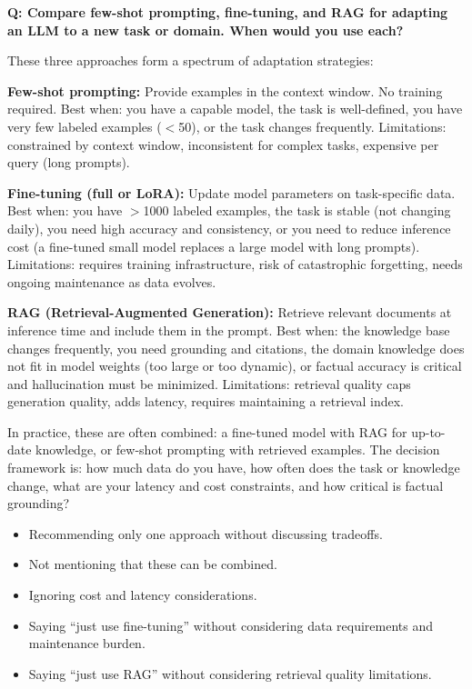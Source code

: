 \begin{interviewq}
\textbf{Q: Compare few-shot prompting, fine-tuning, and RAG for adapting
an LLM to a new task or domain. When would you use each?}

 \quad {} \quad
\badgefreq{\freqhigh}

\stronganswer
These three approaches form a spectrum of adaptation strategies:

\textbf{Few-shot prompting:} Provide examples in the context window.  No
training required.  Best when: you have a capable model, the task is
well-defined, you have very few labeled examples ($<$50), or the task changes
frequently.  Limitations: constrained by context window, inconsistent for
complex tasks, expensive per query (long prompts).

\textbf{Fine-tuning (full or LoRA):} Update model parameters on
task-specific data.  Best when: you have $>$1000 labeled examples, the task
is stable (not changing daily), you need high accuracy and consistency,
or you need to reduce inference cost (a fine-tuned small model replaces a
large model with long prompts).  Limitations: requires training
infrastructure, risk of catastrophic forgetting, needs ongoing maintenance
as data evolves.

\textbf{RAG (Retrieval-Augmented Generation):} Retrieve relevant documents
at inference time and include them in the prompt.  Best when: the knowledge
base changes frequently, you need grounding and citations, the domain
knowledge does not fit in model weights (too large or too dynamic), or
factual accuracy is critical and hallucination must be minimized.
Limitations: retrieval quality caps generation quality, adds latency, requires
maintaining a retrieval index.

In practice, these are often combined: a fine-tuned model with RAG for
up-to-date knowledge, or few-shot prompting with retrieved examples.  The
decision framework is: how much data do you have, how often does the task
or knowledge change, what are your latency and cost constraints, and how
critical is factual grounding?

\redflags
\begin{itemize}
\item Recommending only one approach without discussing tradeoffs.
\item Not mentioning that these can be combined.
\item Ignoring cost and latency considerations.
\item Saying ``just use fine-tuning'' without considering data requirements
  and maintenance burden.
\item Saying ``just use RAG'' without considering retrieval quality
  limitations.
\end{itemize}


\end{interviewq}
